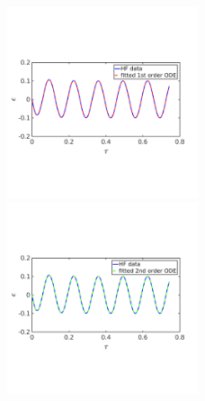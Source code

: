 \documentclass[10pt,xcolor=dvipsnames,compress]{beamer}
\begin{document}
\begin{frame}
\begin{figure}
\includegraphics[trim = 0.in  2.3in 0.in 2.8in, clip, width=0.5\textwidth]{figs/Isin_high_epsfit_1st.png}
~
\includegraphics[trim = 0.in  2.3in 0.in 2.8in, clip, width=0.5\textwidth]{figs/Isin_high_epsfit_2nd.png}
\end{figure}


\vfill
\end{frame}
\end{document}
